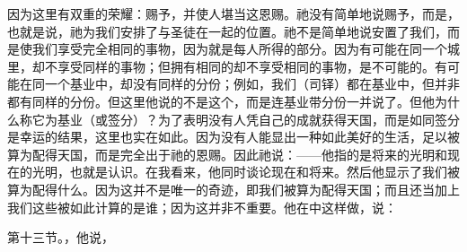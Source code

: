 因为这里有双重的荣耀：赐予，并使人堪当这恩赐。祂没有简单地说赐予，而是，也就是说，祂为我们安排了与圣徒在一起的位置。祂不是简单地说安置了我们，而是使我们享受完全相同的事物，因为就是每人所得的部分。因为有可能在同一个城里，却不享受同样的事物；但拥有相同的却不享受相同的事物，是不可能的。有可能在同一个基业中，却没有同样的分份；例如，我们（司铎）都在基业中，但并非都有同样的分份。但这里他说的不是这个，而是连基业带分份一并说了。但他为什么称它为基业（或签分）？为了表明没有人凭自己的成就获得天国，而是如同签分是幸运的结果，这里也实在如此。因为没有人能显出一种如此美好的生活，足以被算为配得天国，而是完全出于祂的恩赐。因此祂说：——他指的是将来的光明和现在的光明，也就是认识。在我看来，他同时谈论现在和将来。然后他显示了我们被算为配得什么。因为这并不是唯一的奇迹，即我们被算为配得天国；而且还当加上我们这些被如此计算的是谁；因为这并非不重要。他在中这样做，说：\par

第十三节。，他说，\par

